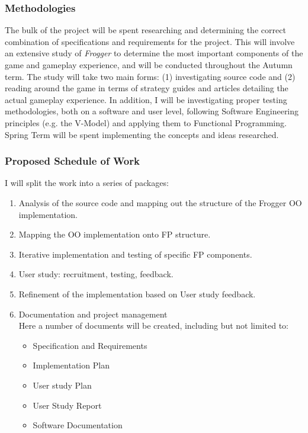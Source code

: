 \documentclass[10pt]{article}
\begin{document}
\subsubsection*{Methodologies}
The bulk of the project will be spent researching and determining the correct combination of specifications and requirements for the project.
This will involve an extensive study of \textit{Frogger} to determine the most important components of the game and gameplay experience, and will be conducted throughout the Autumn term.
The study will take two main forms: (1) investigating source code and (2) reading around the game in terms of strategy guides and articles detailing the actual gameplay experience.
In addition, I will be investigating proper testing methodologies, both on a software and user level, following Software Engineering principles (e.g. the V-Model) and applying them to Functional Programming.
Spring Term will be spent implementing the concepts and ideas researched.

\subsubsection*{Proposed Schedule of Work}
I will split the work into a series of packages:
\begin{enumerate}
  \item Analysis of the source code and mapping out the structure of the Frogger OO implementation.
  \item Mapping the OO implementation onto FP structure.
  \item Iterative implementation and testing of specific FP components.
  \item User study: recruitment, testing, feedback.
  \item Refinement of the implementation based on User study feedback.
  \item Documentation and project management\\
        Here a number of documents will be created, including but not limited to:
        \begin{itemize}
          \item Specification and Requirements
          \item Implementation Plan
          \item User study Plan
          \item User Study Report
          \item Software Documentation
        \end{itemize}
\end{enumerate}
\end{document}
